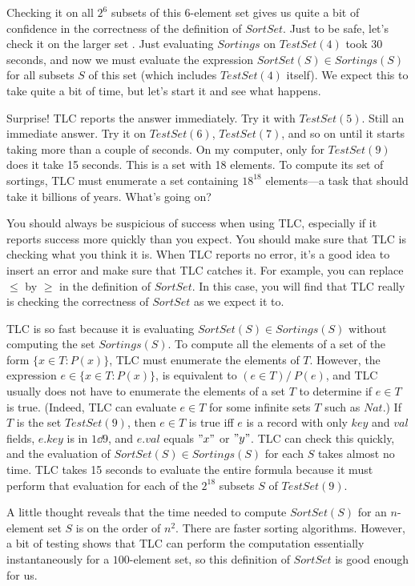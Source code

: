 \documentclass[fleqn,leqno]{article}
\begin{document}
Checking it on all $2^{6}$ subsets of this 6-element set gives us
quite a bit of confidence in the correctness of the definition of
$SortSet$.  Just to be safe, let's check it on the larger set
.  Just evaluating $Sortings$ on
$TestSet(4)$
took 30 seconds, and now we must evaluate the expression
$SortSet(S)\in Sortings(S)$ for all subsets $S$ of this set (which
includes $TestSet(4)$ itself).  We expect this to take quite a bit of
time, but let's start it and see what happens.

Surprise! TLC reports the answer immediately.  Try it with
$TestSet(5)$.  Still an immediate answer.  Try it on $TestSet(6)$,
$TestSet(7)$, and so on until it starts taking more than a couple of
seconds.  On my computer, only for $TestSet(9)$
does it take 15 seconds.  This is a set with 18 elements.  To compute
its set of sortings, TLC must enumerate a set containing $18^{18}$
elements---a task that should take it billions of years.  What's going
on?

You should always be suspicious of success when using TLC, especially
if it reports success more quickly than you expect.  You should make
sure that TLC is checking what you think it is.  When TLC reports no
error, it's a good idea to insert an error and make sure that TLC
catches it.  For example, you can replace $\leq$ by $\geq$ in the
definition of $SortSet$.  In this case, you will find that TLC really
is checking the correctness of $SortSet$ as we expect it to.

TLC is so fast because it is evaluating $SortSet(S) \in Sortings(S)$
without computing the set $Sortings(S)$.  To compute all the
elements of a set of the form $\{x \in T : P(x)\}$, TLC must enumerate
the elements of $T$.  However, the expression
   $e \in \{x \in T : P(x)\}$, 
is equivalent to $(e \in T) /\ P(e)$, and TLC usually does not have to
enumerate the elements of a set $T$ to determine if $e \in T$ is true.
(Indeed, TLC can evaluate $e \in T$ for some infinite sets $T$ such as
$Nat$.)  If $T$ is the set $TestSet(9)$, then $e \in T$ is true iff
$e$ is a record with only $key$ and $val$ fields, $e.key$ is in $1\dd
9$, and $e.val$ equals $"x"$ or $"y"$.  TLC can check this quickly, and
the evaluation of $SortSet(S) \in Sortings(S)$ for each $S$ takes
almost no time.  TLC takes 15 seconds to evaluate the entire formula
because it must perform that evaluation for each of the $2^{18}$
subsets $S$ of $TestSet(9)$.

A little thought reveals that the time needed to compute $SortSet(S)$
for an $n$-element set $S$ is on the order of $n^{2}$.  There are
faster sorting algorithms.  However, a bit of testing shows that TLC
can perform the computation essentially instantaneously for a
$100$-element set, so this definition of $SortSet$ is good enough for
us.
\end{document}
